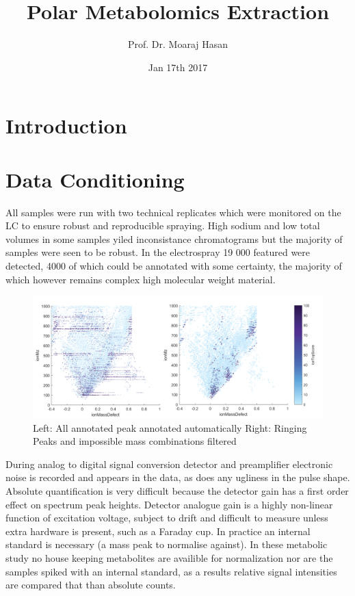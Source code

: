 \documentclass[a4paper]{article}
\title{Polar Metabolomics Extraction}
\author{Prof. Dr. Moaraj Hasan}
\date{Jan 17th 2017}
\begin{document}
\maketitle

\newpage
\section{Introduction}


\section{Data Conditioning}

All samples were run with two technical replicates which were monitored on the LC to ensure robust and reproducible spraying. High sodium and low total volumes in some samples yiled inconsistance chromatograms but the majority of samples were seen to be robust. In the electrospray 19 000 featured were detected, 4000 of which could be annotated with some certainty, the majority of which however remains complex high molecular weight material.  

\begin{figure}[h]
	\centering
	\includegraphics[width=1.0\linewidth]{Peak_filtering}
	\caption{Left: All annotated peak annotated automatically \newline
		Right: Ringing Peaks and impossible mass combinations filtered}
	\label{fig:peakfiltering}
\end{figure}

During analog to digital signal conversion detector and preamplifier electronic noise is recorded and appears in the data, as does any ugliness in the pulse shape. Absolute quantification is very difficult because the detector gain has a first order effect on spectrum peak heights. Detector analogue gain is a highly non-linear function of excitation voltage, subject to drift and difficult to measure unless extra hardware is present, such as a Faraday cup. In practice an internal standard is necessary (a mass peak to normalise against). In these metabolic study no house keeping metabolites are availible for normalization nor are the samples spiked with an internal standard, as a results relative signal intensities are compared that than absolute counts. 
\end{document}

